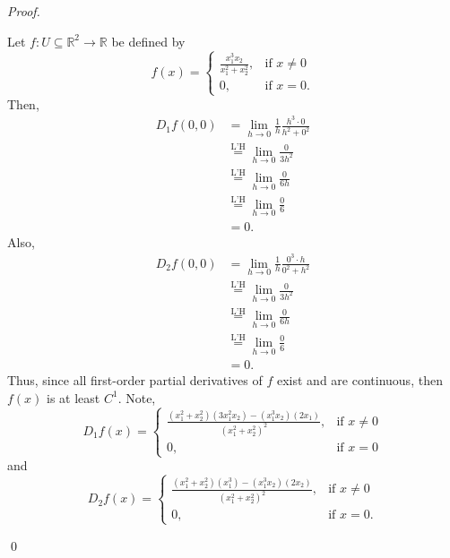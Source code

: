\documentclass[12pt]{article}
\newenvironment{sol}
    {\emph{Proof.}
    }
    {
    \qed
    }
\begin{document}
\begin{sol}
Let $f : U \subseteq \mathbb{R}^2 \to \mathbb{R}$ be defined by $$f(x) = \begin{cases} 
      \frac{x_1^3x_2}{x_1^2 + x_2^2}, &\text{if } x \neq 0 \\ 0, & \text{if } x = 0. 
   \end{cases}$$ Then, \begin{align*}
       D_1f(0,0) &= \lim_{h \to 0}\frac{1}{h}\frac{h^3 \cdot 0}{h^2+0^2} \\ &\stackrel{\text{L'H}}{=} \lim_{h \to 0} \frac{0}{3h^2} \\ &\stackrel{\text{L'H}}{=} \lim_{h \to 0} \frac{0}{6h}  \\ &\stackrel{\text{L'H}}{=} \lim_{h \to 0} \frac{0}{6} \\ &= 0.
   \end{align*} 
   Also, \begin{align*}
       D_2f(0,0) &= \lim_{h \to 0}\frac{1}{h}\frac{0^3 \cdot h}{0^2 + h^2} \\ &\stackrel{\text{L'H}}{=} \lim_{h \to 0} \frac{0}{3h^2} \\ &\stackrel{\text{L'H}}{=} \lim_{h \to 0} \frac{0}{6h}  \\ &\stackrel{\text{L'H}}{=} \lim_{h \to 0} \frac{0}{6} \\ &= 0.
   \end{align*} 
   Thus, since all first-order partial derivatives of $f$ exist and are continuous, then $f(x)$ is at least $C^1$. Note, $$D_1f(x) = \begin{cases} 
      \frac{(x_1^2 + x_2^2)(3x_1^2x_2) - (x_1^3x_2)(2x_1)}{(x_1^2 + x_2^2)^2}, &\text{if } x \neq 0 \\ 0, & \text{if } x = 0
   \end{cases}$$ and $$D_2f(x) = \begin{cases} 
      \frac{(x_1^2 + x_2^2)(x_1^3) - (x_1^3x_2)(2x_2)}{(x_1^2 + x_2^2)^2}, &\text{if } x \neq 0 \\ 0, & \text{if } x = 0.
   \end{cases}$$
   

\end{sol}
\end{document}
